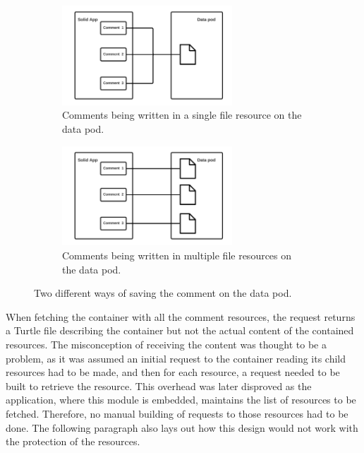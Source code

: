 \begin{figure}
    \centering
    \begin{subfigure}{.5\textwidth}
      \centering
      \includegraphics[width=0.7\textwidth]{prototype/graphs/poc-comment-single-resource-comments.png}
      \caption{Comments being written in a single file resource on the data pod.}
      \label{fig:ppc-comment-single-resource-comments}
    \end{subfigure}%
    \begin{subfigure}{.5\textwidth}
      \centering
      \includegraphics[width=0.7\textwidth]{prototype/graphs/poc-comment-multiple-resources-comments.png}
      \caption{Comments being written in multiple file resources on the data pod.}
      \label{fig:poc-comment-multiple-resources-comments}
    \end{subfigure}
    \caption{Two different ways of saving the comment on the data pod.}
    \label{fig:save-resource}
\end{figure}

When fetching the container with all the comment resources, the request returns a Turtle file describing the container but not the actual content of the contained resources. The misconception of receiving the content was thought to be a problem, as it was assumed an initial request to the container reading its child resources had to be made, and then for each resource, a request needed to be built to retrieve the resource. This overhead was later disproved as the application, where this module is embedded, maintains the list of resources to be fetched. Therefore, no manual building of requests to those resources had to be done. The following paragraph also lays out how this design would not work with the protection of the resources.

